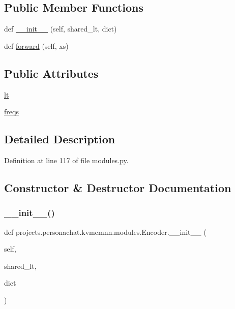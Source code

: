 \subsection*{Public Member Functions}
\begin{DoxyCompactItemize}
\item 
def \hyperlink{classprojects_1_1personachat_1_1kvmemnn_1_1modules_1_1Encoder_a9ec8df457392023bb1d823f204ca645f}{\+\_\+\+\_\+init\+\_\+\+\_\+} (self, shared\+\_\+lt, dict)
\item 
def \hyperlink{classprojects_1_1personachat_1_1kvmemnn_1_1modules_1_1Encoder_a06627a5af4545ab9baad60440ad4e9bb}{forward} (self, xs)
\end{DoxyCompactItemize}
\subsection*{Public Attributes}
\begin{DoxyCompactItemize}
\item 
\hyperlink{classprojects_1_1personachat_1_1kvmemnn_1_1modules_1_1Encoder_aaeceefba978096fa670e5b2b598a2d1c}{lt}
\item 
\hyperlink{classprojects_1_1personachat_1_1kvmemnn_1_1modules_1_1Encoder_ae221f1c7a7a3d2b946b4d9961259a6d3}{freqs}
\end{DoxyCompactItemize}


\subsection{Detailed Description}


Definition at line 117 of file modules.\+py.



\subsection{Constructor \& Destructor Documentation}
\mbox{\label{classprojects_1_1personachat_1_1kvmemnn_1_1modules_1_1Encoder_a9ec8df457392023bb1d823f204ca645f}} 
\subsubsection{\texorpdfstring{\+\_\+\+\_\+init\+\_\+\+\_\+()}{\_\_init\_\_()}}
{\footnotesize\ttfamily def projects.\+personachat.\+kvmemnn.\+modules.\+Encoder.\+\_\+\+\_\+init\+\_\+\+\_\+ (\begin{DoxyParamCaption}\item[{}]{self,  }\item[{}]{shared\+\_\+lt,  }\item[{}]{dict }\end{DoxyParamCaption})}



